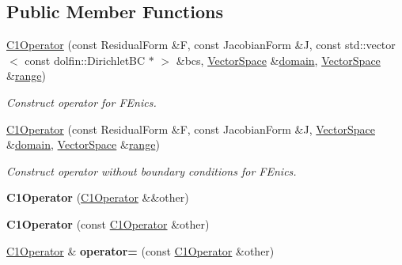 \subsection*{Public Member Functions}
\begin{DoxyCompactItemize}
\item 
\hyperlink{classSpacy_1_1FEniCS_1_1C1Operator_af23d84bd48d0902011bf80ba2f4cd394}{C1\+Operator} (const Residual\+Form \&F, const Jacobian\+Form \&J, const std\+::vector$<$ const dolfin\+::\+Dirichlet\+BC $\ast$ $>$ \&bcs, \hyperlink{classSpacy_1_1VectorSpace}{Vector\+Space} \&\hyperlink{classSpacy_1_1OperatorBase_a2588f9b3e0188820c4c494e63293dc6f}{domain}, \hyperlink{classSpacy_1_1VectorSpace}{Vector\+Space} \&\hyperlink{classSpacy_1_1OperatorBase_ab19d3b7a6f290b1079248f1e567e53d6}{range})
\begin{DoxyCompactList}\small\item\em Construct operator for F\+Enics. \end{DoxyCompactList}\item 
\hyperlink{classSpacy_1_1FEniCS_1_1C1Operator_afe6c4eb8960290212a16a1eca2267b48}{C1\+Operator} (const Residual\+Form \&F, const Jacobian\+Form \&J, \hyperlink{classSpacy_1_1VectorSpace}{Vector\+Space} \&\hyperlink{classSpacy_1_1OperatorBase_a2588f9b3e0188820c4c494e63293dc6f}{domain}, \hyperlink{classSpacy_1_1VectorSpace}{Vector\+Space} \&\hyperlink{classSpacy_1_1OperatorBase_ab19d3b7a6f290b1079248f1e567e53d6}{range})
\begin{DoxyCompactList}\small\item\em Construct operator without boundary conditions for F\+Enics. \end{DoxyCompactList}\item 
{\bfseries C1\+Operator} (\hyperlink{classSpacy_1_1FEniCS_1_1C1Operator}{C1\+Operator} \&\&other)\hypertarget{classSpacy_1_1FEniCS_1_1C1Operator_a4ab2b79f50f05b4cc4403269dad87e1e}{}\label{classSpacy_1_1FEniCS_1_1C1Operator_a4ab2b79f50f05b4cc4403269dad87e1e}

\item 
{\bfseries C1\+Operator} (const \hyperlink{classSpacy_1_1FEniCS_1_1C1Operator}{C1\+Operator} \&other)\hypertarget{classSpacy_1_1FEniCS_1_1C1Operator_a8bedc9295f43ebe21be9e2a9337da1e5}{}\label{classSpacy_1_1FEniCS_1_1C1Operator_a8bedc9295f43ebe21be9e2a9337da1e5}

\item 
\hyperlink{classSpacy_1_1FEniCS_1_1C1Operator}{C1\+Operator} \& {\bfseries operator=} (const \hyperlink{classSpacy_1_1FEniCS_1_1C1Operator}{C1\+Operator} \&other)\hypertarget{classSpacy_1_1FEniCS_1_1C1Operator_a1e74d332b9cb30ed83d757a39453c47c}{}\label{classSpacy_1_1FEniCS_1_1C1Operator_a1e74d332b9cb30ed83d757a39453c47c}


\end{DoxyCompactItemize}
